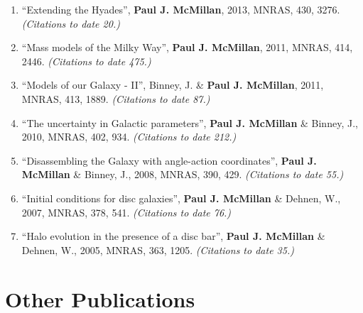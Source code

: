\documentclass{resume}
\begin{document}
\begin{enumerate}
\item ``Extending the Hyades'', \textbf{Paul J. McMillan}, 2013, MNRAS, 430, 3276. \textit{(Citations to date 20.)}

\item ``Mass models of the Milky Way'', \textbf{Paul J. McMillan}, 2011, MNRAS, 414, 2446. \textit{(Citations to date 475.)}

\item ``Models of our Galaxy - II'', Binney, J. \& \textbf{Paul J. McMillan}, 2011, MNRAS, 413, 1889. \textit{(Citations to date 87.)}

\item ``The uncertainty in Galactic parameters'', \textbf{Paul J. McMillan} \& Binney, J., 2010, MNRAS, 402, 934. \textit{(Citations to date 212.)}

\item ``Disassembling the Galaxy with angle-action coordinates'', \textbf{Paul J. McMillan} \& Binney, J., 2008, MNRAS, 390, 429. \textit{(Citations to date 55.)}

\item ``Initial conditions for disc galaxies'', \textbf{Paul J. McMillan} \& Dehnen, W., 2007, MNRAS, 378, 541. \textit{(Citations to date 76.)}

\item ``Halo evolution in the presence of a disc bar'', \textbf{Paul J. McMillan} \& Dehnen, W., 2005, MNRAS, 363, 1205. \textit{(Citations to date 35.)}

\end{enumerate}\section*{Other Publications}
\end{document}
